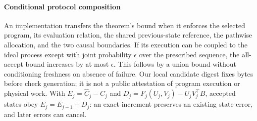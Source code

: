 \paragraph{Conditional protocol composition}
An implementation transfers the theorem's bound when it enforces the selected program, its evaluation relation, the shared previous-state reference, the pathwise allocation, and the two causal boundaries. If its execution can be coupled to the ideal process except with joint probability $\epsilon$ over the prescribed sequence, the all-accept bound increases by at most $\epsilon$. This follows by a union bound without conditioning freshness on absence of failure. Our local candidate digest fixes bytes before check generation; it is not a public attestation of program execution or physical work. With $E_j=\widehat C_j-C_j$ and $D_j=F_j(U_j,V_j)-U_jV_j^\top B$, accepted states obey $E_j=E_{j-1}+D_j$: an exact increment preserves an existing state error, and later errors can cancel.
